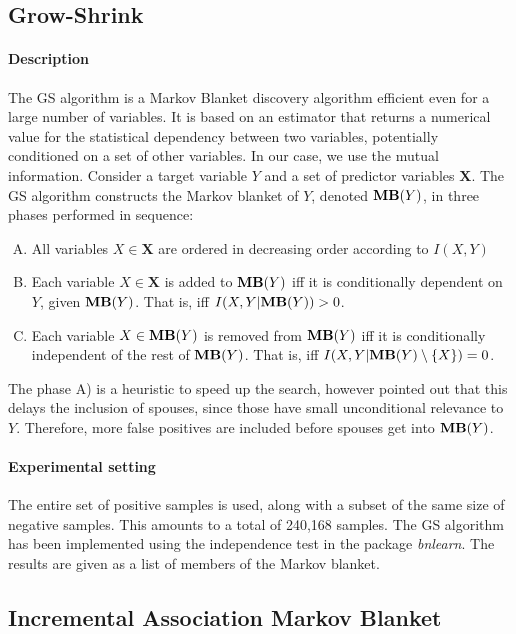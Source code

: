 \subsection{Grow-Shrink}

\paragraph{Description} The GS algorithm \parencite{margaritis2000bayesian} is a
Markov Blanket discovery algorithm efficient even for a large number of
variables. It is based on an estimator that returns a numerical value for the
statistical dependency between two variables, potentially conditioned on a set
of other variables. In our case, we use the mutual information. Consider a
target variable $Y$ and a set of predictor variables $\bm X$. The GS algorithm
constructs the Markov blanket of $Y$, denoted $\textbf{MB}(Y)$, in three phases
performed in sequence:

\begin{enumerate}[A)]
    \item All variables $X\in\bm X$ are ordered in decreasing order according to
    $I(X, Y)$
    \item Each variable $X\in\bm X$ is added to $\textbf{MB}(Y)$ iff it is
    conditionally dependent on $Y$, given $\textbf{MB}(Y)$. That is, iff $I(X,
    Y|\textbf{MB}(Y)) > 0$.
    \item Each variable $X\in\textbf{MB}(Y)$ is removed from $\textbf{MB}(Y)$
    iff it is conditionally independent of the rest of $\textbf{MB}(Y)$. That
    is, iff $I(X, Y|\textbf{MB}(Y)\setminus\{X\}) = 0$.
\end{enumerate}

The phase A) is a heuristic to speed up the search, however
\textcite{tsamardinos2003algorithms} pointed out that this delays the inclusion
of spouses, since those have small unconditional relevance to $Y$. Therefore,
more false positives are included before spouses get into $\textbf{MB}(Y)$.

\paragraph{Experimental setting} The entire set of positive samples is used,
along with a subset of the same size of negative samples. This amounts to a
total of 240,168 samples. The GS algorithm has been implemented using the
independence test in the package \emph{bnlearn}. The results are given as a
list of members of the Markov blanket.


\subsection{Incremental Association Markov Blanket}

